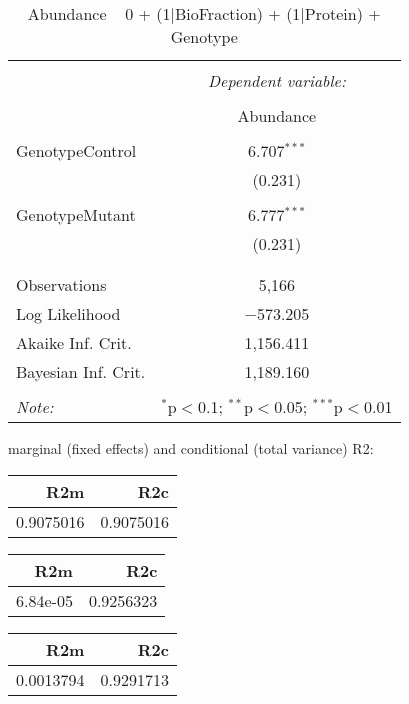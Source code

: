 \documentclass[11pt]{report}
\begin{document}
\begin{table}[!htbp] \centering 
  \caption{Abundance ~ 0 + (1|BioFraction) + (1|Protein) + Genotype} 
  \label{} 
\begin{tabular}{@{\extracolsep{5pt}}lc} 
\\[-1.8ex]\hline 
\hline \\[-1.8ex] 
 & \multicolumn{1}{c}{\textit{Dependent variable:}} \\ 
\cline{2-2} 
\\[-1.8ex] & Abundance \\ 
\hline \\[-1.8ex] 
 GenotypeControl & 6.707$^{***}$ \\ 
  & (0.231) \\ 
  & \\ 
 GenotypeMutant & 6.777$^{***}$ \\ 
  & (0.231) \\ 
  & \\ 
\hline \\[-1.8ex] 
Observations & 5,166 \\ 
Log Likelihood & $-$573.205 \\ 
Akaike Inf. Crit. & 1,156.411 \\ 
Bayesian Inf. Crit. & 1,189.160 \\ 
\hline 
\hline \\[-1.8ex] 
\textit{Note:}  & \multicolumn{1}{r}{$^{*}$p$<$0.1; $^{**}$p$<$0.05; $^{***}$p$<$0.01} \\ 
\end{tabular} 
\end{table} 
marginal (fixed effects) and conditional (total variance) R2:

\begin{tabular}{r|r}
\hline
R2m & R2c\\
\hline
0.9075016 & 0.9075016\\
\hline
\end{tabular}

\begin{tabular}{r|r}
\hline
R2m & R2c\\
\hline
6.84e-05 & 0.9256323\\
\hline
\end{tabular}

\begin{tabular}{r|r}
\hline
R2m & R2c\\
\hline
0.0013794 & 0.9291713\\
\hline
\end{tabular}
\end{document}
